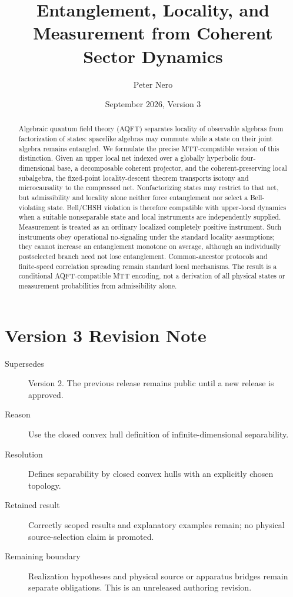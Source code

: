 \documentclass[11pt]{article}
\title{Entanglement, Locality, and Measurement from Coherent Sector Dynamics}
\author{Peter Nero}
\date{September 2026, Version 3}
\begin{document}
\maketitle


\begin{abstract}
Algebraic quantum field theory (AQFT) separates locality of observable
algebras from factorization of states: spacelike algebras may commute while a
state on their joint algebra remains entangled.  We formulate the precise
MTT-compatible version of this distinction.  Given an upper local net indexed
over a globally hyperbolic four-dimensional base, a decomposable coherent
projector, and the coherent-preserving local subalgebra, the fixed-point
locality-descent theorem transports isotony and microcausality to the
compressed net.  Nonfactorizing states may restrict to that net, but
admissibility and locality alone neither force entanglement nor select a
Bell-violating state.  Bell/CHSH violation is therefore compatible with
upper-local dynamics when a suitable nonseparable state and local instruments
are independently supplied.  Measurement is treated as an ordinary localized
completely positive instrument.  Such instruments obey operational
no-signaling under the standard locality assumptions; they cannot increase an
entanglement monotone on average, although an individually postselected branch
need not lose entanglement.  Common-ancestor protocols and finite-speed
correlation spreading remain standard local mechanisms.  The result is a
conditional AQFT-compatible MTT encoding, not a derivation of all physical
states or measurement probabilities from admissibility alone.
\end{abstract}

\section*{Version 3 Revision Note}
\begin{description}
\item[Supersedes] Version 2. The previous release remains public until a new release is approved.
\item[Reason] Use the closed convex hull definition of infinite-dimensional separability.
\item[Resolution] Defines separability by closed convex hulls with an explicitly chosen topology.
\item[Retained result] Correctly scoped results and explanatory examples remain; no physical source-selection claim is promoted.
\item[Remaining boundary] Realization hypotheses and physical source or apparatus bridges remain separate obligations. This is an unreleased authoring revision.
\end{description}
\end{document}
